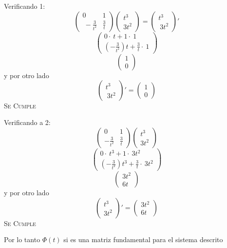Verificando 1:
    $$\begin{pmatrix}0&1\\ \:-\frac{3}{t^2}&\frac{3}{t}\end{pmatrix}\begin{pmatrix}t^3\\ 3t^2\end{pmatrix}=\begin{pmatrix}t^3\\ \:3t^2\end{pmatrix}'$$
    $$\begin{pmatrix}0\cdot \:t+1\cdot \:1\\ \left(-\frac{3}{t^2}\right)t+\frac{3}{t}\cdot \:1\end{pmatrix}$$
    $$\begin{pmatrix}1\\ 0\end{pmatrix}$$
    y por otro lado
    $$\begin{pmatrix}t^3\\ \:3t^2\end{pmatrix}'=\begin{pmatrix}1\\ 0\end{pmatrix}$$
\textsc{Se Cumple}

Verificando a 2:
    $$\begin{pmatrix}0&1\\ -\frac{3}{t^2}&\frac{3}{t}\end{pmatrix}\begin{pmatrix}t^3\\ 3t^2\end{pmatrix}$$
    $$\begin{pmatrix}0\cdot \:t^3+1\cdot \:3t^2\\ \left(-\frac{3}{t^2}\right)t^3+\frac{3}{t}\cdot \:3t^2\end{pmatrix}$$
    $$\begin{pmatrix}3t^2\\ 6t\end{pmatrix}$$
    y por otro lado
    $$\begin{pmatrix}t^3\\ 3t^2\end{pmatrix}'=\begin{pmatrix}3t^2\\ 6t\end{pmatrix}$$
\textsc{Se Cumple}

Por lo tanto $\Phi(t)$ si es una matriz fundamental para el sistema descrito


    